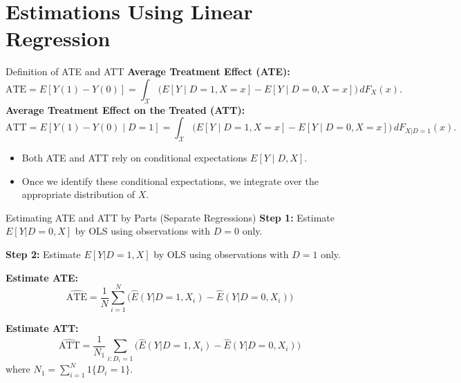 \documentclass[xcolor=svgnames,t]{beamer}
\begin{document}
\section{Estimations Using Linear Regression}

\begin{frame}{Definition of ATE and ATT}
\textbf{Average Treatment Effect (ATE):}
\[
\text{ATE} = E[Y(1) - Y(0)] = \int_{\mathcal{X}} \bigl(E[Y \mid D=1, X=x] - E[Y \mid D=0, X=x]\bigr)\,dF_X(x).
\]
\pause
\textbf{Average Treatment Effect on the Treated (ATT):}
\[
\text{ATT} = E[Y(1)-Y(0) \mid D=1] = \int_{\mathcal{X}} \bigl(E[Y \mid D=1, X=x] - E[Y \mid D=0, X=x]\bigr)\,dF_{X|D=1}(x).
\]

\pause
\begin{itemize}
    \item Both ATE and ATT rely on conditional expectations $E[Y \mid D,X]$.
    \item Once we identify these conditional expectations, we integrate over the appropriate distribution of $X$.
\end{itemize}
\end{frame}

\begin{frame}{Estimating ATE and ATT by Parts (Separate Regressions)}
    \textbf{Step 1:} Estimate $E[Y|D=0,X]$ by OLS using observations with $D=0$ only. \pause
    
    \textbf{Step 2:} Estimate $E[Y|D=1,X]$ by OLS using observations with $D=1$ only. \pause
    
    \textbf{Estimate ATE:} 
    \[
    \widehat{\text{ATE}} = \frac{1}{N}\sum_{i=1}^{N} \bigl(\widehat{E}(Y|D=1,X_i) - \widehat{E}(Y|D=0,X_i)\bigr)
    \]
    \pause
    
    \textbf{Estimate ATT:}
    \[
    \widehat{\text{ATT}} = \frac{1}{N_1}\sum_{i: D_i=1} \bigl(\widehat{E}(Y|D=1,X_i) - \widehat{E}(Y|D=0,X_i)\bigr)
    \]
    where $N_1 = \sum_{i=1}^{N} 1\{D_i=1\}.$
    \end{frame}
    
\end{document}
